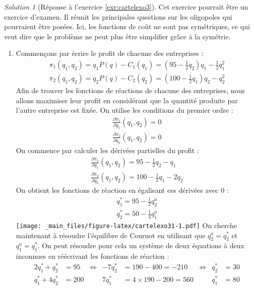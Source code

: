 \documentclass[
]{book}
\providecommand{\tightlist}{%
  \setlength{\itemsep}{0pt}\setlength{\parskip}{0pt}}
\theoremstyle{definition}
\theoremstyle{definition}
\theoremstyle{definition}
\theoremstyle{definition}
\theoremstyle{remark}
\newtheorem*{solution}{Solution}
\begin{document}
\begin{solution}[Réponse à l'exercice \ref{exr:cartelexo3}]

Cet exercice pourrait être un exercice d'examen.
Il réunit les principales questions sur les oligopoles qui pourraient être posées.
Ici, les fonctions de coût ne sont pas symétriques, ce qui veut dire que le problème ne peut plus être simplifier grâce à la symétrie.

\begin{enumerate}
\def\labelenumi{\arabic{enumi}.}
\tightlist
\item
  Commençons par écrire le profit de chacune des entreprises :
  \begin{gather*}
  \pi_1(q_1, q_2)=q_1P(q)-C_1(q_1)=\left(95-\frac{1}{2}q_2\right)q_1-\frac{1}{2}q_1^2\\
  \pi_2(q_1, q_2)=q_2P(q)-C_2(q_2)=\left(100-\frac{1}{2}q_1\right)q_2-q_2^2
  \end{gather*}
  Afin de trouver les fonctions de réactions de chacune des entreprises, nous allons maximiser leur profit en considérant que la quantité produite par l'autre entreprise est fixée.
  On utilise les conditions du premier ordre :
  \begin{gather*}
  \frac{\partial \pi_1}{\partial q_1}(q_1, q_2)=0\\
  \frac{\partial \pi_2}{\partial q_2}(q_1, q_2)=0
  \end{gather*}
  On commence par calculer les dérivées partielles du profit :
  \begin{gather*}
  \frac{\partial \pi_1}{\partial q_1}(q_1, q_2)=95-\frac{1}{2}q_2-q_1\\
  \frac{\partial \pi_2}{\partial q_2}(q_1, q_2)=100-\frac{1}{2}q_1-2q_2
  \end{gather*}
  On obtient les fonctions de réaction en égalisant ces dérivées avec 0 :
  \begin{gather*}
  q_1^*=95-\frac{1}{2}q_2^a\\
  q_2^*=50-\frac{1}{4}q_1^a
  \end{gather*}
  \texttt{[image: \_main\_files/figure-latex/cartelexo31-1.pdf]}
  On cherche maintenant à résoudre l'équilibre de Cournot en utilisant que \(q_2^a=q_2^*\) et \(q_1^a=q_1^*\).
  On peut résoudre pour cela un système de deux équations à deux inconnues en réécrivant les fonctions de réaction :
  \begin{align*}
  2q_1^*+q_2^*&=95 &\Leftrightarrow &-7q_2^*&=190-400=-210&\Leftrightarrow &q_2^*&=30\\
  q_1^*+4q_2^*&=200 & &7q_1^*&=4\times 190-200=560& &q_1^*&=80

\end{align*}
\end{enumerate}
\end{solution}
\end{document}
